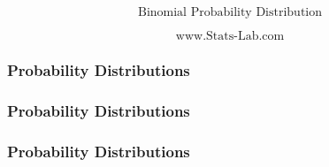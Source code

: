 \documentclass{beamer}
\begin{document}
\begin{frame}

\Large
\[ \mbox{Binomial Probability Distribution}  \]

\[ \mbox{www.Stats-Lab.com}\]

\end{frame}
\begin{frame}
\frametitle{Probability Distributions}


\end{frame}
\begin{frame}
\frametitle{Probability Distributions}


\end{frame}
\begin{frame}
\frametitle{Probability Distributions}


\end{frame}
\end{document}
